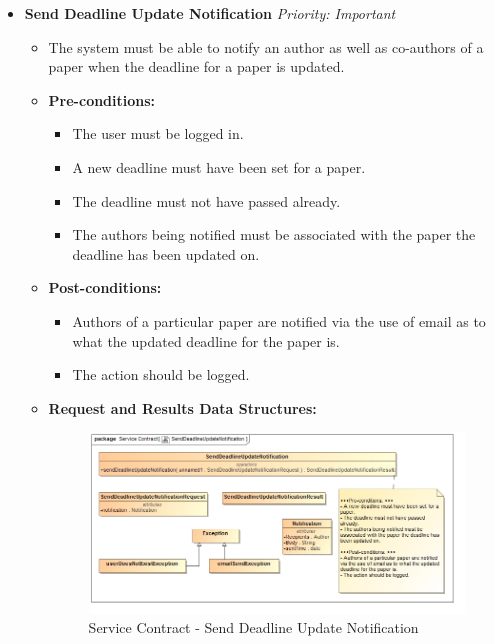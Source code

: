\documentclass{article}
\begin{document}
\begin{itemize}
					\item \textbf{Send Deadline Update Notification} \hfill \textit{Priority: Important}
					\begin{itemize}
						\item The system must be able to notify an author as well as co-authors of a paper when the deadline for a paper is updated.
						\item \textbf{Pre-conditions:}
						\begin{itemize}
							\item The user must be logged in.
							\item A new deadline must have been set for a paper.
							\item The deadline must not have passed already.
							\item The authors being notified must be associated with the paper the deadline has been updated on.
						\end{itemize}
						\item \textbf{Post-conditions:}
						\begin{itemize}
							\item Authors of a particular paper are notified via the use of email as to what the updated deadline for the paper is.
							\item The action should be logged.
						\end{itemize}
						\item \textbf{Request and Results Data Structures:}
						\begin{figure}[H]
							\includegraphics[width=\linewidth]{../Diagrams/ServiceContracts/Notification subsystem/SendDeadlineUpdateNotification.jpg}
							\caption{Service Contract - Send Deadline Update Notification}
						\end{figure}
					\end{itemize}
				\end{itemize}
				
\end{document}
